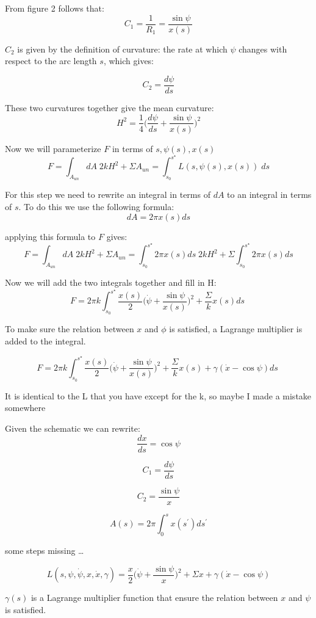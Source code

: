 \documentclass[12pt]{article}
\begin{document}
From figure 2 follows that:
$$
C_1=\frac{1}{R_1}=\frac{\sin{\psi}}{x(s)}
$$

$C_2$ is given by the definition of curvature: the rate at which $\psi$ changes with respect to the arc length $s$, which gives:

$$
C_2=\frac{d\psi}{ds}
$$

These two curvatures together give the mean curvature:
$$
H^2=\frac{1}{4}\bigg(\frac{d\psi}{ds}+\frac{\sin{\psi}}{x(s)}\bigg)^2
$$


Now we will parameterize $F$ in terms of $s, \psi(s), x(s)$
$$
F = \int_{A_{un}} dA \; 2kH^2  + \Sigma A_{un} = \int_{s_0}^{s^\star} L(s,\psi(s),x(s)) \; ds
$$


For this step we need to rewrite an integral in terms of $dA$ to an integral in terms of $s$. To do this we use the following formula:
$$
dA=2\pi x(s)ds
$$

applying this formula to $F$ gives:
$$
F = \int_{A_{un}} dA \; 2kH^2  + \Sigma A_{un} = \int_{s_0}^{s^\star} 2\pi x(s)ds \; 2kH^2 + \Sigma \int_{s_0}^{s^\star} 2\pi x(s)  ds
$$

Now we will add the two integrals together and fill in H:
$$
F = 2\pi k \int_{s_0}^{s^\star} \frac{x(s)}{2} \bigg(\dot{\psi}+\frac{\sin{\psi}}{x(s)}\bigg)^2  + \frac{\Sigma}{k} x(s) ds \;
$$

To make sure the relation between $x$ and $\phi$ is satisfied, a Lagrange multiplier is added to the integral.

$$
F = 2\pi k \int_{s_0}^{s^\star} \frac{x(s)}{2} \bigg(\dot{\psi}+\frac{\sin{\psi}}{x(s)}\bigg)^2  + \frac{\Sigma}{k} x(s) +\gamma(\dot{x}-\cos \psi)ds\;
$$

\alert{It is identical to the L that you have except for the k, so maybe I made a mistake somewhere} 


\color{black}


Given the schematic we can rewrite:
$$
\frac{dx}{ds} = \cos \psi
$$

$$
C_1 = \frac{d\psi}{ds} 
$$

$$
C_2 = \frac{\sin \psi}{x} 
$$

$$
A(s) = 2 \pi \int_{0}^{s} x(s^{\prime}) ds^{\prime}
$$


\alert{some steps missing \dots}

$$
L(s,\psi,\dot{\psi},x,\dot{x},\gamma) = \frac{x}{2} \bigg(\dot{\psi}+\frac{\sin \psi}{x}\bigg)^2 + \Sigma x + \gamma(\dot{x}-\cos \psi)
$$

$\gamma(s)$ is a Lagrange multiplier function that ensure the relation between $x$ and $\psi$ is satisfied.
\end{document}
